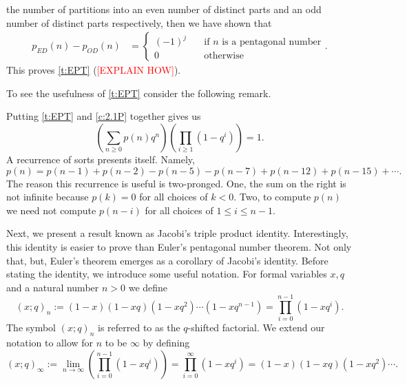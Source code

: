 the number of partitions into an even number of distinct parts and an odd number of distinct parts respectively, then we have shown that
\begin{align*}
    p_{ED}(n)-p_{OD}(n) &= 
    \begin{cases}
        (-1)^j & \quad \text{if } n \text{ is a pentagonal number} \\
        0 & \quad \text{otherwise}
    \end{cases}.
\end{align*}
This proves \cref{t:EPT} (\textcolor{red}{[EXPLAIN HOW]}). 

\par
To see the usefulness of \cref{t:EPT} consider the following remark.
\begin{remark}
Putting \cref{t:EPT} and \cref{c:2.1P} together gives us \[
\left(\sum_{n\geq 0}p(n)q^n\right)\left(\prod_{i\geq 1}(1-q^i)\right) = 1.
\] A recurrence of sorts presents itself. Namely,
\[
p(n) = p(n-1)+p(n-2)-p(n-5)-p(n-7)+p(n-12)+p(n-15)+\cdots. 
\] The reason this recurrence is useful is two-pronged. One, the sum on the right is not infinite because $p(k)=0$ for all choices of $k<0$. Two, to compute $p(n)$ we need not compute $p(n-i)$ for all choices of $1\leq i\leq n-1$.
\end{remark}
Next, we present a result known as Jacobi's triple product identity. Interestingly, this identity is easier to prove than Euler's pentagonal number theorem. Not only that, but, Euler's theorem emerges as a corollary of Jacobi's identity. Before stating the identity, we introduce some useful notation. For formal variables $x,q$ and a natural number $n>0$ we define
\[
(x;q)_n := (1-x)(1-xq)(1-xq^2)\cdots(1-xq^{n-1}) = \prod_{i=0}^{n-1}(1-xq^i).
\]
The symbol $(x;q)_n$ is referred to as the $q$-shifted factorial. We extend our notation to allow for $n$ to be $\infty$ by defining
\[
(x;q)_\infty := \lim_{n\to \infty}\left(\prod_{i=0}^{n-1}(1-xq^i)\right) = \prod_{i=0}^{\infty}(1-xq^i) = (1-x)(1-xq)(1-xq^2)\cdots.
\]
\endinput
